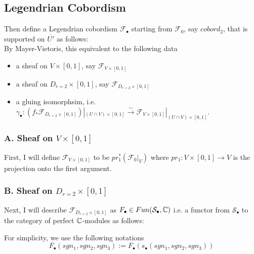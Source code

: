 \subsection{Legendrian Cobordism}
Then define a Legendrian cobordism $\mathscr{F}_\bullet$ starting from $\mathscr{F}_0$, say $cobord_2$, that is supported on $\overline{U'}$ as follows:\\

By Mayer-Vietoris, this equivalent to the following data
\begin{itemize}
\item a sheaf on $V\times [0,1]$, say $\mathscr{F}_{V\times [0,1]}$

\item a sheaf on $D_{r=2}\times [0,1]$, say $\mathscr{F}_{D_{r=2}\times [0,1]}$

\item a gluing isomorphsim, i.e. $\gamma_\bullet : (f_*\mathscr{F}_{D_{r=2}\times [0,1]})|_{(U\cap V)\times [0,1]} \xrightarrow{\sim} \mathscr{F}_{V\times [0,1]}|_{(U\cap V)\times [0,1]}$.
\end{itemize}
\subsubsection{A. Sheaf on $V\times [0,1]$}
First, I will define $\mathscr{F}_{V\times [0,1]}$ to be $pr_1^*(\mathscr{F}_0|_V)$ where $pr_1 : V \times [0,1] \rightarrow V$ is the projection onto the first argument.
\subsubsection{B. Sheaf on $D_{r=2}\times [0,1]$}
Next, I will describe $\mathscr{F}_{D_{r=2}\times [0,1]}$ as $F_\bullet \in Fun(\mathcal{S}_\bullet,\mathbb{C})$ i.e. a functor from $\mathcal{S}_\bullet$ to the category of perfect $\mathbb{C}$-modules as follows: 

For simplicity, we use the following notations
\[
F_\bullet(sgn_1,sgn_2,sgn_3):= F_\bullet(s_\bullet(sgn_1,sgn_2,sgn_3))
\]

